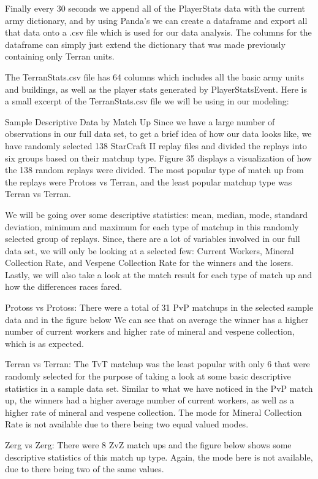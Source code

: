 \documentclass[a4paper,12pt]{report}
\begin{document}
Finally every 30 seconds we append all of the PlayerStats data with the current army dictionary, and by using Panda’s we can create a dataframe and export all that data onto a .csv file which is used for our data analysis. The columns for the dataframe can simply just extend the dictionary that was made previously containing only Terran units.


The TerranStats.csv file has 64 columns which includes all the basic army units and buildings, as well as the player stats generated by PlayerStatsEvent. Here is a small excerpt of the TerranStats.csv file we will be using in our modeling:


Sample Descriptive Data by Match Up
Since we have a large number of observations in our full data set, to get a brief idea of how our data looks like, we have randomly selected 138 StarCraft II replay files and divided the replays into six groups based on their matchup type. Figure 35 displays a visualization of how the 138 random replays were divided. The most popular type of match up from the replays were Protoss vs Terran, and the least popular matchup type was Terran vs Terran. 

We will be going over some descriptive statistics: mean, median, mode, standard deviation, minimum and maximum for each type of matchup in this randomly selected group of replays. Since, there are a lot of variables involved in our full data set, we will only be looking at a selected few: Current Workers, Mineral Collection Rate, and Vespene Collection Rate for the winners and the losers. Lastly, we will also take a look at the match result for each type of match up and how the differences races fared. 

Protoss vs Protoss:
There were a total of 31 PvP matchups in the selected sample data and in the figure below We can see that on average the winner has a higher number of current workers and higher rate of mineral and vespene collection, which is as expected. 

Terran vs Terran:
The TvT matchup was the least popular with only 6 that were randomly selected for the purpose of taking a look at some basic descriptive statistics in a sample data set. Similar to what we have noticed in the PvP match up, the winners had a higher average number of current workers, as well as a higher rate of mineral and vespene collection. The mode for Mineral Collection Rate is not available due to there being two equal valued modes. 

Zerg vs Zerg:
There were 8 ZvZ match ups and the figure below shows some descriptive statistics of this match up type. Again, the mode here is not available, due to there being two of the same values. 
\end{document}
